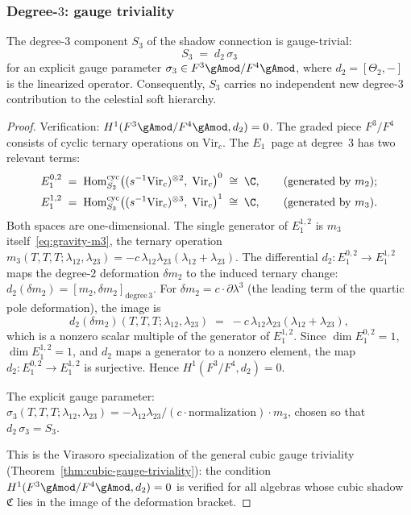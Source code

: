 \subsubsection*{Degree-$3$: gauge triviality}

\begin{theorem}
\label{thm:gravity-cubic-gauge-trivial}
The degree-$3$ component $S_3$ of the shadow connection is
gauge-trivial:
\[
S_3 \;=\; d_2\,\sigma_3
\]
for an explicit gauge parameter
$\sigma_3 \in F^3\gAmod / F^4\gAmod$, where $d_2 = [\Theta_2, -]$
is the linearized operator. Consequently, $S_3$ carries no
independent new degree-$3$ contribution to the celestial soft
hierarchy.
\end{theorem}

\begin{proof}
Verification: $H^1(F^3\gAmod/F^4\gAmod, d_2) = 0$.
The graded piece $F^3/F^4$ consists of cyclic ternary
operations on $\mathrm{Vir}_c$. The $E_1$~page at degree~$3$
has two relevant terms:
\begin{align*}
E_1^{0,2}
&\;=\;
\operatorname{Hom}_{S_2}^{\mathrm{cyc}}\!
\left(
 (s^{-1}\mathrm{Vir}_c)^{\otimes 2},\;
 \mathrm{Vir}_c
\right)^0
\;\cong\; \C,
\qquad
\text{(generated by $m_2$)}; \\
E_1^{1,2}
&\;=\;
\operatorname{Hom}_{S_3}^{\mathrm{cyc}}\!
\left(
 (s^{-1}\mathrm{Vir}_c)^{\otimes 3},\;
 \mathrm{Vir}_c
\right)^1
\;\cong\; \C,
\qquad
\text{(generated by $m_3$)}.
\end{align*}
Both spaces are one-dimensional. The single generator
of $E_1^{1,2}$ is $m_3$ itself~\eqref{eq:gravity-m3},
the ternary operation
$m_3(T,T,T;\lambda_{12},\lambda_{23})
= -c\,\lambda_{12}\lambda_{23}(\lambda_{12}+\lambda_{23})$.
The differential
$d_2 \colon E_1^{0,2} \to E_1^{1,2}$ maps the
degree-$2$ deformation $\delta m_2$ to the induced ternary
change: $d_2(\delta m_2) = [m_2, \delta m_2]_{\mathrm{degree}\,3}$.
For $\delta m_2 = c \cdot \partial\lambda^3$ (the leading term
of the quartic pole deformation), the image is
\[
d_2(\delta m_2)(T,T,T;\lambda_{12},\lambda_{23})
\;=\;
-c\,\lambda_{12}\lambda_{23}(\lambda_{12}+\lambda_{23}),
\]
which is a nonzero scalar multiple of the generator of
$E_1^{1,2}$. Since $\dim E_1^{0,2} = 1$,
$\dim E_1^{1,2} = 1$, and $d_2$ maps a generator to a
nonzero element, the map $d_2 \colon E_1^{0,2} \to E_1^{1,2}$
is surjective. Hence $H^1(F^3/F^4, d_2) = 0$.

The explicit gauge parameter: $\sigma_3(T,T,T;\lambda_{12},
\lambda_{23}) = -\lambda_{12}\lambda_{23}/(c\cdot\text{normalization})
\cdot m_3$, chosen so that $d_2\,\sigma_3 = S_3$.

This is the Virasoro specialization of the general cubic gauge
triviality (Theorem~\ref{thm:cubic-gauge-triviality}): the
condition $H^1(F^3\gAmod/F^4\gAmod, d_2) = 0$ is verified
for all algebras whose cubic shadow $\mathfrak{C}$ lies in the
image of the deformation bracket.
\end{proof}


